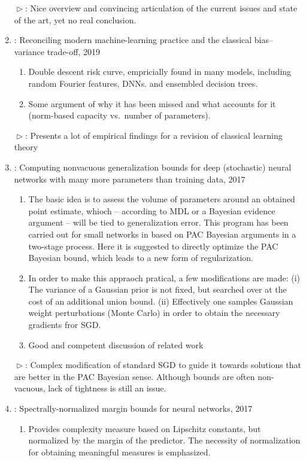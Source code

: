 \documentclass[10pt,a4paper]{article}
\renewcommand{\th}{$\vartriangleright$}
\begin{document}
\begin{enumerate}
\begin{enumerate}
\end{enumerate}
\th: Nice overview and convincing articulation of the current issues and state of the art, yet no real conclusion.  
\item \cite{belkin2019reconciling}: Reconciling modern machine-learning practice and the classical bias--variance trade-off, 2019
\begin{enumerate}
\item Double descent risk curve, empricially found in many models, including random Fourier features, DNNs. and ensembled decision trees.  
\item Some argument of why it has been missed and what accounts for it (norm-based capacity vs.~number of parameters).
\end{enumerate}
\th: Presents a lot of empirical findings for a revision of classical learning theory
\item \cite{dziugaite2017computing}: Computing nonvacuous generalization bounds for deep (stochastic) neural networks with many more parameters than training data, 2017
\begin{enumerate}
\item The basic idea is to assess the volume of parameters around an obtained point estimate, whioch -- according to MDL or a Bayesian evidence argument -- will be tied to generalization error. This program has been carried out for small networks in \cite{langford2002not} based on PAC Bayesian arguments \cite{mcallester1999pac} in a two-stage process. Here it is suggested to directly optimize the PAC Bayesian bound, which leads to a new form of regularization. 
\item In order to make this appraoch pratical, a few modifications are made: (i) The variance of a Gaussian prior is not fixed, but searched over at the cost of an additional union bound. (ii) Effectively one samples Gaussian weight perturbations (Monte Carlo) in order to obtain the necessary gradients fror SGD. 
\item Good and competent discussion of related work
\end{enumerate}
\th: Complex modification of standard SGD to guide it towards solutions that are better in the PAC Bayesian sense. Although bounds are often non-vacuous, lack of tightness is still an issue. 
\item \cite{bartlett2017spectrally}: Spectrally-normalized margin bounds for neural networks, 2017
\begin{enumerate}
\item Provides complexity measure based on Lipschitz constants, but normalized by the margin of the predictor. The necessity of normalization for obtaining meaningful measures is emphasized. 

\end{enumerate}
\end{enumerate}
\end{document}
